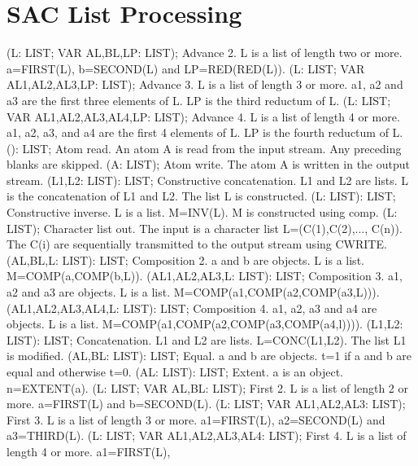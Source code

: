 \section{ SAC List Processing  } 
 (L: LIST; VAR AL,BL,LP: LIST); \eproc
\bcom Advance 2. L is a list of length two or more. a=FIRST(L),
b=SECOND(L) and LP=RED(RED(L)). \ecom 
{} (L: LIST; VAR AL1,AL2,AL3,LP: LIST); \eproc
\bcom Advance 3. L is a list of length 3 or more. a1, a2 and a3 are
the first three elements of L. LP is the third reductum of L. \ecom 
{} (L: LIST; VAR AL1,AL2,AL3,AL4,LP: LIST); \eproc
\bcom Advance 4. L is a list of length 4 or more. a1, a2, a3, and a4
are the first 4 elements of L. LP is the fourth reductum of L. \ecom 
{} (): LIST; \eproc
\bcom Atom read. An atom A is read from the input stream. Any preceding
blanks are skipped. \ecom 
{} (A: LIST); \eproc
\bcom Atom write. The atom A is written in the output stream. \ecom 
{} (L1,L2: LIST): LIST; \eproc
\bcom Constructive concatenation. L1 and L2 are lists. L is the
concatenation of L1 and L2. The list L is constructed. \ecom 
{} (L: LIST): LIST; \eproc
\bcom Constructive inverse. L is a list. M=INV(L). M is constructed
using comp. \ecom 
{} (L: LIST); \eproc
\bcom Character list out. The input is a character list L=(C(1),C(2),...,
C(n)).  The C(i) are sequentially transmitted to the output stream 
using CWRITE. \ecom 
{} (AL,BL,L: LIST): LIST; \eproc
\bcom Composition 2. a and b are objects. L is a list.
M=COMP(a,COMP(b,L)). \ecom 
{} (AL1,AL2,AL3,L: LIST): LIST; \eproc
\bcom Composition 3. a1, a2 and a3 are objects. L is a list.
M=COMP(a1,COMP(a2,COMP(a3,L))). \ecom 
{} (AL1,AL2,AL3,AL4,L: LIST): LIST; \eproc
\bcom Composition 4. a1, a2, a3 and a4 are objects. L is a list.
M=COMP(a1,COMP(a2,COMP(a3,COMP(a4,l)))). \ecom 
{} (L1,L2: LIST): LIST; \eproc
\bcom Concatenation. L1 and L2 are lists. L=CONC(L1,L2). The list L1 is
modified. \ecom 
{} (AL,BL: LIST): LIST; \eproc
\bcom Equal. a and b are objects. t=1 if a and b are equal and
otherwise t=0. \ecom 
{} (AL: LIST): LIST; \eproc
\bcom Extent. a is an object. n=EXTENT(a). \ecom 
{} (L: LIST; VAR AL,BL: LIST); \eproc
\bcom First 2. L is a list of length 2 or more. a=FIRST(L) and
b=SECOND(L). \ecom 
{} (L: LIST; VAR AL1,AL2,AL3: LIST); \eproc
\bcom First 3. L is a list of length 3 or more. a1=FIRST(L),
a2=SECOND(L) and a3=THIRD(L). \ecom 
{} (L: LIST; VAR AL1,AL2,AL3,AL4: LIST); \eproc
\bcom First 4. L is a list of length 4 or more. a1=FIRST(L),
